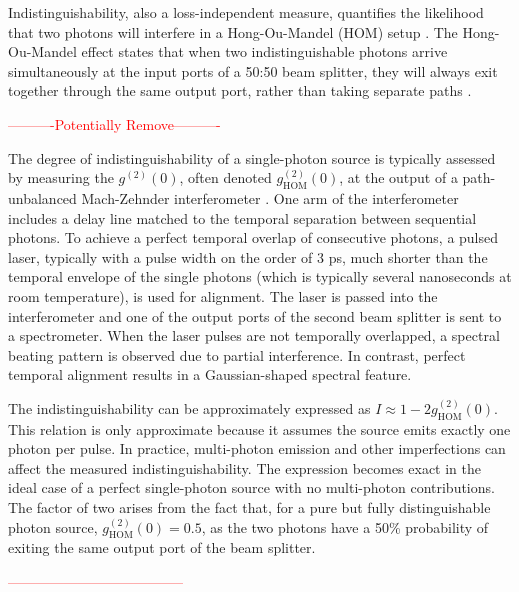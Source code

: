 Indistinguishability, also a loss-independent measure, quantifies the likelihood that two photons will interfere in a Hong-Ou-Mandel (HOM) setup \cite{Hong1987}. The Hong-Ou-Mandel effect states that when two indistinguishable photons arrive simultaneously at the input ports of a 50:50 beam splitter, they will always exit together through the same output port, rather than taking separate paths \cite{Hong1987}.

\textcolor{red}{----------Potentially Remove----------}

The degree of indistinguishability of a single-photon source is typically assessed by measuring the $g^{(2)}(0)$, often denoted $g^{(2)}_{\text{HOM}}(0)$, at the output of a path-unbalanced Mach-Zehnder interferometer \cite{Rarity2024}. One arm of the interferometer includes a delay line matched to the temporal separation between sequential photons. To achieve a perfect temporal overlap of consecutive photons, a pulsed laser, typically with a pulse width on the order of 3 ps, much shorter than the temporal envelope of the single photons (which is typically several nanoseconds at room temperature), is used for alignment. The laser is passed into the interferometer and one of the output ports of the second beam splitter is sent to a spectrometer. When the laser pulses are not temporally overlapped, a spectral beating pattern is observed due to partial interference. In contrast, perfect temporal alignment results in a Gaussian-shaped spectral feature.

The indistinguishability can be approximately expressed as $ I \approx 1 - 2g^{(2)}_{\text{HOM}}(0) $. This relation is only approximate because it assumes the source emits exactly one photon per pulse. In practice, multi-photon emission and other imperfections can affect the measured indistinguishability. The expression becomes exact in the ideal case of a perfect single-photon source with no multi-photon contributions. The factor of two arises from the fact that, for a pure but fully distinguishable photon source, $ g^{(2)}_{\text{HOM}}(0) = 0.5 $, as the two photons have a 50\% probability of exiting the same output port of the beam splitter. 

\textcolor{red}{--------------------------------------}

